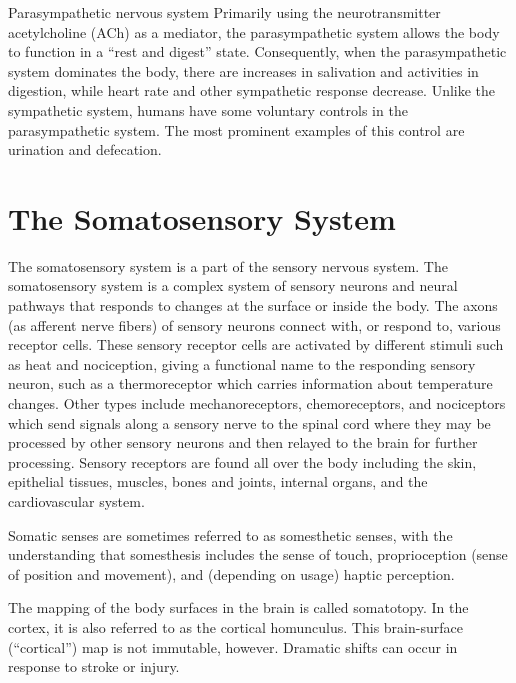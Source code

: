 Parasympathetic nervous system
Primarily using the neurotransmitter acetylcholine (ACh) as a mediator, the parasympathetic system allows the body to function in a ``rest and digest'' state. Consequently, when the parasympathetic system dominates the body, there are increases in salivation and activities in digestion, while heart rate and other sympathetic response decrease. Unlike the sympathetic system, humans have some voluntary controls in the parasympathetic system. The most prominent examples of this control are urination and defecation.

\hypertarget{the-somatosensory-system}{%
\chapter{The Somatosensory System}\label{the-somatosensory-system}}

The somatosensory system is a part of the sensory nervous system. The somatosensory system is a complex system of sensory neurons and neural pathways that responds to changes at the surface or inside the body. The axons (as afferent nerve fibers) of sensory neurons connect with, or respond to, various receptor cells. These sensory receptor cells are activated by different stimuli such as heat and nociception, giving a functional name to the responding sensory neuron, such as a thermoreceptor which carries information about temperature changes. Other types include mechanoreceptors, chemoreceptors, and nociceptors which send signals along a sensory nerve to the spinal cord where they may be processed by other sensory neurons and then relayed to the brain for further processing. Sensory receptors are found all over the body including the skin, epithelial tissues, muscles, bones and joints, internal organs, and the cardiovascular system.

Somatic senses are sometimes referred to as somesthetic senses, with the understanding that somesthesis includes the sense of touch, proprioception (sense of position and movement), and (depending on usage) haptic perception.

The mapping of the body surfaces in the brain is called somatotopy. In the cortex, it is also referred to as the cortical homunculus. This brain-surface (``cortical'') map is not immutable, however. Dramatic shifts can occur in response to stroke or injury.

